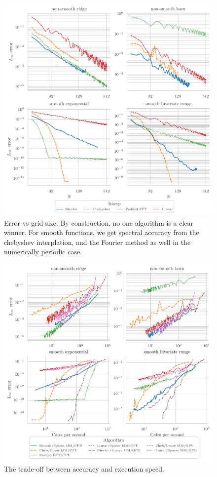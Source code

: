 \begin{enumerate}
	
	\begin{figure}[htbp!]
		\includegraphics[scale=1]{ConvergenceAllNew.pdf}	
		\caption{Error vs grid size.  By construction, no one algorithm is a clear winner.  For smooth functions, we get spectral accuracy from the chebyshev interplation, and the Fourier method as well in the numerically periodic case.     }  	\end{figure}

	\begin{figure}[htbp!]
	\includegraphics[scale=1]{OptimalAllNew.pdf}	
	\caption{The trade-off between accuracy and execution speed.     }  	\end{figure}


	
	
\end{enumerate}  






